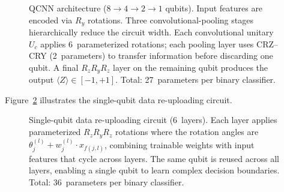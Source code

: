 \begin{figure}[ht]
\caption{QCNN architecture ($8 \to 4 \to 2 \to 1$ qubits). Input features are encoded via $R_y$ rotations. Three convolutional-pooling stages hierarchically reduce the circuit width. Each convolutional unitary $U_c$ applies 6~parameterized rotations; each pooling layer uses CRZ--CRY (2~parameters) to transfer information before discarding one qubit. A final $R_z R_y R_z$ layer on the remaining qubit produces the output $\langle Z \rangle \in [-1, +1]$. Total: 27~parameters per binary classifier.}
\label{fig:qcnn_circuit}
\end{figure}

Figure~\ref{fig:reup_circuit} illustrates the single-qubit data re-uploading circuit.

\begin{figure}[ht]
\centering
{}
\caption{Single-qubit data re-uploading circuit (6~layers). Each layer applies parameterized $R_z R_y R_z$ rotations where the rotation angles are $\theta_j^{(l)} + w_j^{(l)} \cdot x_{f(j,l)}$, combining trainable weights with input features that cycle across layers. The same qubit is reused across all layers, enabling a single qubit to learn complex decision boundaries. Total: 36~parameters per binary classifier.}
\label{fig:reup_circuit}
\end{figure}

